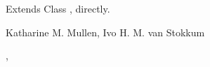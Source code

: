 \begin{Section}{Extends}
Class , directly.
\end{Section}
\begin{Author}\relax
Katharine M. Mullen, Ivo H. M. van Stokkum
\end{Author}
\begin{SeeAlso}\relax
{}, 
\end{SeeAlso}

